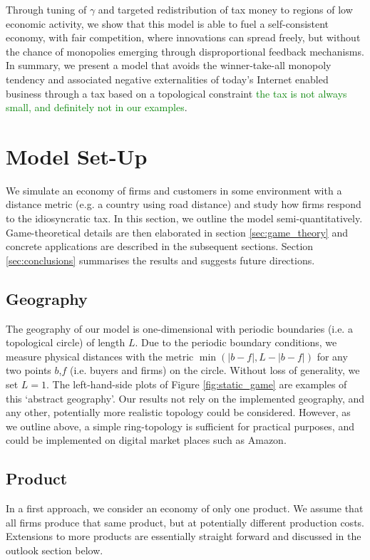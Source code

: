 \documentclass[final,3p,times,authoryear,12pt]{elsarticle}
\newcommand{\green}[1]{\textcolor{Green}{#1}} %
\begin{document}
Through tuning of $\gamma$ and targeted redistribution of tax money to regions of low economic activity, we show that this model is able to fuel a self-consistent economy, 
with fair competition, where innovations can spread freely, but without the chance of monopolies emerging through disproportional feedback mechanisms. 
In summary, we present a model that avoids the winner-take-all monopoly tendency and associated negative externalities of today's Internet enabled business through a tax based on a topological constraint \green{the tax is not always small, and definitely not in our examples}. 


\section{Model Set-Up}

We simulate an economy of firms and customers in some environment with a distance metric (e.g. a country using road distance) and study how firms respond to the idiosyncratic tax.
In this section, we outline the model semi-quantitatively. 
Game-theoretical details are then elaborated in section \ref{sec:game_theory} and concrete applications are described in the subsequent sections. 
Section \ref{sec:conclusions} summarises the results and suggests future directions. 

\subsection{Geography}
The geography of our model is one-dimensional with periodic boundaries (i.e. a topological circle) of length $L$. 
Due to the periodic boundary conditions, we measure physical distances with the metric $\min(|b-f|, L-|b-f|)$ for any two points $b$,$f$ (i.e. buyers and firms) on the circle. 
Without loss of generality, we set $L=1$. 
The left-hand-side plots of Figure \ref{fig:static_game} are examples of this `abstract geography'.
Our results not rely on the implemented geography, and any other, potentially more realistic topology could be considered.
However, as we outline above, a simple ring-topology is sufficient for practical purposes, and could be implemented on digital market places such as Amazon. 

\subsection{Product}
In a first approach, we consider an economy of only one product. 
We assume that all firms produce that same product, but at potentially different production costs. 
Extensions to more products are essentially straight forward and discussed in the outlook section below. 
\end{document}
